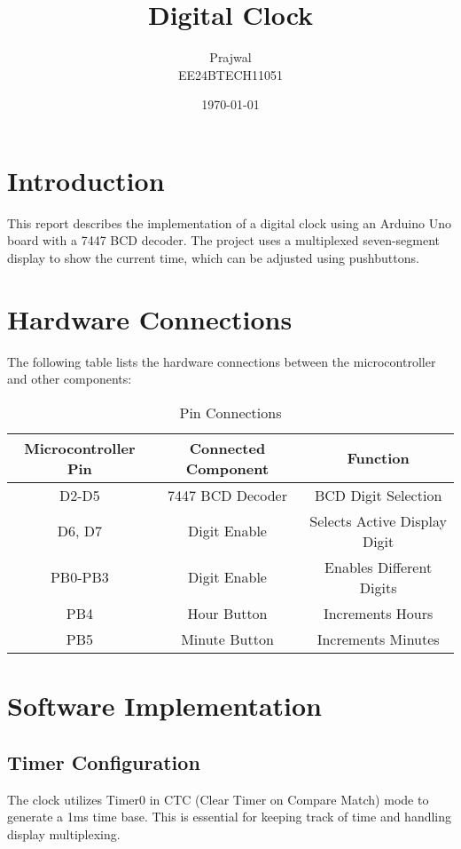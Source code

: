 \documentclass{article}
\title{Digital Clock}
\author{Prajwal\\EE24BTECH11051}
\date{\today}
\begin{document}
\maketitle

\section{Introduction}
This report describes the implementation of a digital clock using an Arduino Uno board with a 7447 BCD decoder. The project uses a multiplexed seven-segment display to show the current time, which can be adjusted using pushbuttons.

\section{Hardware Connections}
The following table lists the hardware connections between the microcontroller and other components:

\begin{table}[h]
    \centering
    \begin{tabular}{|c|c|c|}
        \hline
        \textbf{Microcontroller Pin} & \textbf{Connected Component} & \textbf{Function} \\
        \hline
        D2-D5 & 7447 BCD Decoder & BCD Digit Selection \\
        D6, D7 & Digit Enable & Selects Active Display Digit \\
        PB0-PB3 & Digit Enable & Enables Different Digits \\
        PB4 & Hour Button & Increments Hours \\
        PB5 & Minute Button & Increments Minutes \\
        \hline
    \end{tabular}
    \caption{Pin Connections}
    \label{tab:connections}
\end{table}
\section{Software Implementation}

\subsection{Timer Configuration}
The clock utilizes Timer0 in CTC (Clear Timer on Compare Match) mode to generate a 1ms time base. This is essential for keeping track of time and handling display multiplexing.
\end{document}
